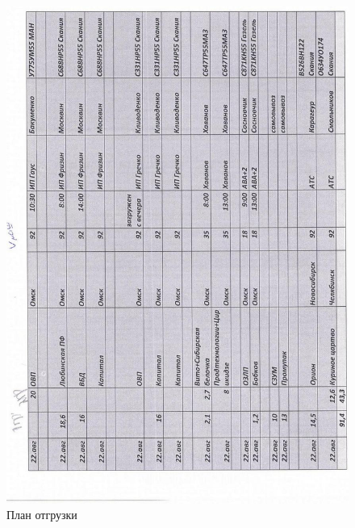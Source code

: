 \begin{figure}
\begin{center}
 \includegraphics[width=\linewidth, height=0.94\textheight, keepaspectratio]{Pics/d34.jpg}
\end{center}
 \caption{План отгрузки}
 \label{pic:d34}
\end{figure}

